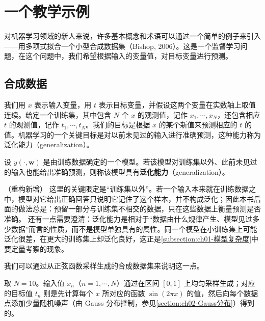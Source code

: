 \documentclass[../../main.tex]{subfiles}
\begin{document}
\section{一个教学示例}\label{section:ch01-一个教学示例}

对机器学习领域的新人来说，许多基本概念和术语可以通过一个简单的例子来引入——用多项式拟合一个小型合成数据集（Bishop, 2006）。这是一个监督学习问题，在这个问题中，我们希望根据输入的变量值，对目标变量进行预测。

\subsection{合成数据}\label{subsection:ch01-合成数据}

我们用 $x$ 表示输入变量，用 $t$ 表示目标变量，并假设这两个变量在实数轴上取值连续。给定一个训练集，其中包含 $N$ 个 $x$ 的观测值，记作 $x_1,\cdots,x_N$，还包含相应 $t$ 的观测值，记作 $t_1,\cdots,t_N$。我们的目标是根据 $x$ 的某个新值来预测相应的 $t$ 的值。机器学习的一个关键目标是对以前未见过的输入进行准确预测，这种能力称为泛化能力（generalization）。

\begin{definition}[泛化能力]\label{definition:ch01-泛化能力}
设 $y(\cdot,\mathbf{w})$ 是由训练数据确定的一个模型。若该模型对训练集以外、此前未见过的输入也能给出准确预测，则称该模型具有\textbf{泛化能力}（generalization）。
\end{definition}

\begin{remark}（重构新增）
这里的关键限定是“训练集以外”。若一个输入本来就在训练数据之中，模型对它给出正确回答只说明它记住了这个样本，并不构成泛化；因此本书后面的做法总是：预留一部分与训练集不相交的数据，只在这些数据上衡量预测是否准确。
还有一点需要澄清：泛化能力是相对于“数据由什么规律产生、模型见过多少数据”而言的性质，而不是模型单独具有的属性。同一个模型在小训练集上可能泛化很差，在更大的训练集上却泛化良好，这正是\cref{subsection:ch01-模型复杂度}中要定量考察的现象。
\end{remark}

我们可以通过从正弦函数采样生成的合成数据集来说明这一点。

\begin{example}[ 正弦合成数据集]\label{example:ch01-正弦合成数据集}
取 $N=10$。输入值 $x_n$（$n=1,\cdots,N$）通过在区间 $[0,1]$ 上均匀采样生成；对应的目标值 $t_n$ 则是先计算每个 $x$ 所对应的函数 $\sin(2\pi x)$ 的值，然后向每个数据点添加少量随机噪声（由 Gauss 分布控制，参见\cref{section:ch02-Gauss分布}）得到的。
\end{example}
\end{document}
